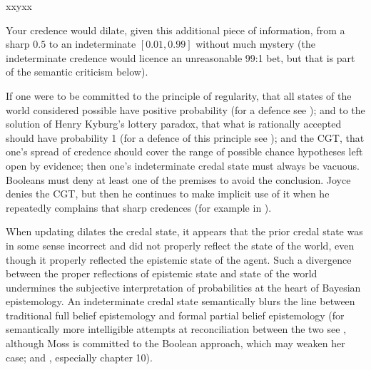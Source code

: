 \addtocounter{expls}{1}


xxyxx

Your credence would dilate, given this additional piece
of information, from a sharp $0.5$ to an indeterminate
$[0.01,0.99]$ without much mystery (the indeterminate
credence would licence an unreasonable 99:1 bet, but
that is part of the semantic criticism below).

If one were to be committed to the principle of
regularity, that all states of the world considered
possible have positive probability (for a defence see
); and to the solution of
Henry Kyburg's lottery paradox, that what is rationally
accepted should have probability 1 (for a defence of
this principle see );
and the CGT, that one's spread of credence should cover
the range of possible chance hypotheses left open by
evidence; then one's indeterminate credal state must
always be vacuous. Booleans must deny at least one of
the premises to avoid the conclusion. Joyce denies the
CGT, but then he continues to make implicit use of it
when he repeatedly complains that sharp credences
 (for example in
).

When updating dilates the credal state, it appears that
the prior credal state was in some sense incorrect and
did not properly reflect the state of the world, even
though it properly reflected the epistemic state of the
agent. Such a divergence between the proper reflections
of epistemic state and state of the world undermines
the subjective interpretation of probabilities at the
heart of Bayesian epistemology. An indeterminate credal
state semantically blurs the line between traditional
full belief epistemology and formal partial belief
epistemology (for semantically more intelligible
attempts at reconciliation between the two see
, although Moss is committed to the
Boolean approach, which may weaken her case; and
, especially chapter 10).

